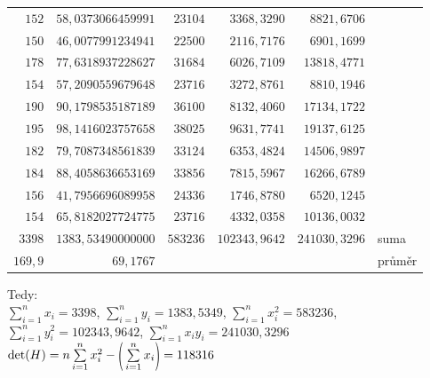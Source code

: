 \documentclass[a4paper, 11pt]{article}
\newcommand{\intopen}[1]{\scaleleftright[1ex]{(}{#1}{)}}
\begin{document}
\begin{table}[H]
\begin{tabular}{|r|r|r|r|r|r}
			$ 152 $ & $ 58,0373066459991 $ & $ 23104 $ & $ 3368,3290 $
			& $ 8821,6706 $ & \multicolumn{1}{l}{}\\ \cline{1-5}

			$ 150 $ & $ 46,0077991234941 $ & $ 22500 $ & $ 2116,7176 $
			& $ 6901,1699 $ & \multicolumn{1}{l}{} \\ \cline{1-5}

			$ 178 $ & $ 77,6318937228627 $ & $ 31684 $ & $ 6026,7109 $
			& $ 13818,4771 $ & \multicolumn{1}{l}{} \\ \cline{1-5}

			$ 154 $ & $ 57,2090559679648 $ & $ 23716 $ & $ 3272,8761 $
			& $ 8810,1946 $ & \multicolumn{1}{l}{} \\ \cline{1-5}

			$ 190 $ & $ 90,1798535187189 $ & $ 36100 $ & $ 8132,4060 $
			& $ 17134,1722 $ & \multicolumn{1}{l}{} \\ \cline{1-5}

			$ 195 $ & $ 98,1416023757658 $ & $ 38025 $ & $ 9631,7741 $
			& $ 19137,6125 $ & \multicolumn{1}{l}{} \\ \cline{1-5}

			$ 182 $ & $ 79,7087348561839 $ & $ 33124 $ & $ 6353,4824 $
			& $ 14506,9897 $ & \multicolumn{1}{l}{} \\ \cline{1-5}

			$ 184 $ & $ 88,4058636653169 $ & $ 33856 $ & $ 7815,5967 $
			& $ 16266,6789 $ & \multicolumn{1}{l}{} \\ \cline{1-5}

			$ 156 $ & $ 41,7956696089958 $ & $ 24336 $ & $ 1746,8780 $
			& $ 6520,1245 $ & \multicolumn{1}{l}{} \\ \cline{1-5}

			$ 154 $ & $ 65,8182027724775 $ & $ 23716 $ & $ 4332,0358 $
			& $ 10136,0032 $ & \multicolumn{1}{l}{} \\ \cmidrule[1pt]{1-5}

			$ 3398 $ & $ 1383,53490000000 $ & $ 583236 $ & $ 102343,9642 $
			& $ 241030,3296 $ & \multicolumn{1}{l}{suma}
			\\ \cmidrule[1pt]{1-5}

			$ 169,9 $ & $ 69,1767 $ & \multicolumn{1}{l}{}
			& \multicolumn{1}{l}{} & \multicolumn{1}{l}{}
			& \multicolumn{1}{l}{průměr} \\ \cline{1-2}
		\end{tabular}
	\end{table}

	Tedy: \\
	$ \sum\limits_{i = 1}^n x_i = 3398 $, $ \sum\limits_{i = 1}^n y_i =
	1383,5349 $, $ \sum\limits_{i = 1}^n x_i^2 = 583236 $, $ \sum\limits_{i =
	1}^n y_i^2 = 102343,9642 $, $ \sum\limits_{i = 1}^n x_i y_i =
	241030,3296 $ \\
	$ \mathrm{det}(H) = n \sum\limits_{i = 1}^n x_i^2 -
	\intopen{\sum\limits_{i = 1}^n x_i} = 118316 $
\end{document}
